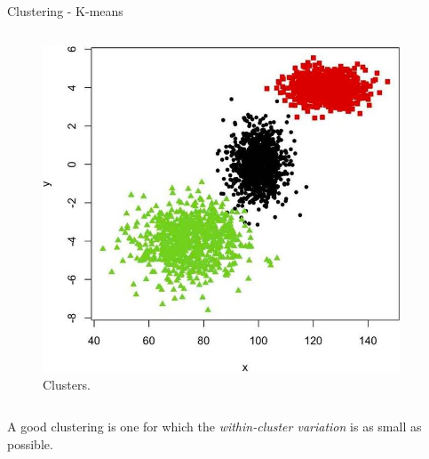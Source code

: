 \begin{frame}[allowframebreaks]{Clustering - K-means}
\begin{columns}
    \begin{column}{0.55\textwidth}
        \begin{figure}
            \centering
            \includegraphics[width=0.95\textwidth,keepaspectratio]{images/dul/kmeans/k-means-example-1.jpg}
            \caption{Clusters.}
        \end{figure}
    \end{column}
\end{columns}

\framebreak

\begin{columns}
    \begin{column}{0.45\textwidth}
    A good clustering is one for which the \textit{within-cluster variation} is as small as possible.


\end{column}
\end{columns}
\end{frame}
